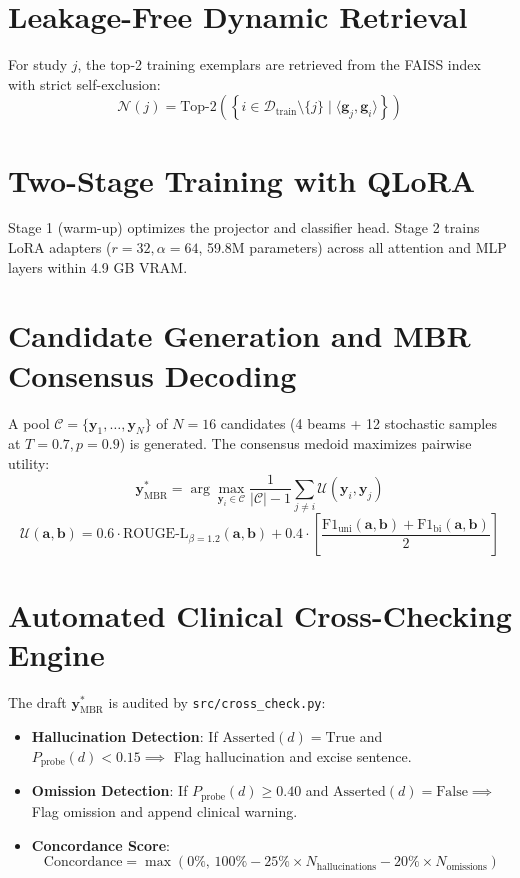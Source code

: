 \documentclass[12pt,a4paper]{report}
\begin{document}
\section{Leakage-Free Dynamic Retrieval}
For study $j$, the top-2 training exemplars are retrieved from the FAISS index with strict self-exclusion:
\begin{equation}
\mathcal{N}(j) = \text{Top-}2 \left( \left\{ i \in \mathcal{D}_{\text{train}} \setminus \{j\} \mid \langle \mathbf{g}_j, \mathbf{g}_i \rangle \right\} \right)
\end{equation}

\section{Two-Stage Training with QLoRA}
Stage 1 (warm-up) optimizes the projector and classifier head. Stage 2 trains LoRA adapters ($r=32, \alpha=64$, 59.8M parameters) across all attention and MLP layers within 4.9 GB VRAM.

\section{Candidate Generation and MBR Consensus Decoding}
A pool $\mathcal{C} = \{\mathbf{y}_1, \dots, \mathbf{y}_N\}$ of $N = 16$ candidates (4 beams + 12 stochastic samples at $T=0.7, p=0.9$) is generated. The consensus medoid maximizes pairwise utility:
\begin{equation}
\mathbf{y}^*_{\text{MBR}} = \arg\max_{\mathbf{y}_i \in \mathcal{C}} \frac{1}{|\mathcal{C}| - 1} \sum_{j \neq i} \mathcal{U}(\mathbf{y}_i, \mathbf{y}_j)
\end{equation}
\begin{equation}
\mathcal{U}(\mathbf{a}, \mathbf{b}) = 0.6 \cdot \text{ROUGE-L}_{\beta=1.2}(\mathbf{a}, \mathbf{b}) + 0.4 \cdot \left[ \frac{\text{F1}_{\text{uni}}(\mathbf{a}, \mathbf{b}) + \text{F1}_{\text{bi}}(\mathbf{a}, \mathbf{b})}{2} \right]
\end{equation}

\section{Automated Clinical Cross-Checking Engine}
The draft $\mathbf{y}^*_{\text{MBR}}$ is audited by \texttt{src/cross\_check.py}:
\begin{itemize}
    \item \textbf{Hallucination Detection}: If $\text{Asserted}(d) = \text{True}$ and $P_{\text{probe}}(d) < 0.15 \implies$ Flag hallucination and excise sentence.
    \item \textbf{Omission Detection}: If $P_{\text{probe}}(d) \ge 0.40$ and $\text{Asserted}(d) = \text{False} \implies$ Flag omission and append clinical warning.
    \item \textbf{Concordance Score}:
    \begin{equation}
    \text{Concordance} = \max\left(0\%,\, 100\% - 25\% \times N_{\text{hallucinations}} - 20\% \times N_{\text{omissions}}\right)
    \end{equation}
\end{itemize}
\end{document}
